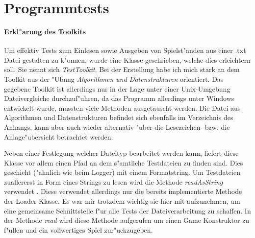 \section{Programmtests}
\FloatBarrier

\paragraph{Erkl"arung des Toolkits}
Um effektiv Tests zum Einlesen sowie Ausgeben von Spielst"anden aus einer .txt Datei gestalten zu k"onnen, wurde eine Klasse geschrieben, welche dies erleichtern soll. Sie nennt sich \emph{TestToolkit}. Bei der Erstellung habe ich mich stark an dem Toolkit aus der "Ubung \emph{Algorithmen und Datenstrukturen} orientiert. Das gegebene Toolkit ist allerdings nur in der Lage unter einer Unix-Umgebung Dateivergleiche durchzuf"uhren, da das Programm allerdings unter Windows entwickelt wurde, mussten viele Methoden ausgetauscht werden. Die Datei aus Algorithmen und Datenstrukturen befindet sich ebenfalls im Verzeichnis des Anhangs, kann aber auch wieder alternativ "uber die Lesezeichen- bzw. die Anlage"ubersicht betrachtet werden. 


Neben einer Festlegung welcher Dateityp bearbeitet werden kann, liefert diese Klasse vor allem einen Pfad an dem s"amtliche Testdateien zu finden sind. Dies geschieht ("ahnlich wie beim Logger) mit einem Formatstring. Um Testdateien zuallererst in Form eines Strings zu lesen wird die Methode \emph{readAsString} verwendet . Diese verwendet allerdings nur die bereits implementierte Methode der Loader-Klasse. Es war mir trotzdem wichtig sie hier mit aufzunehmen, um eine gemeinsame Schnittstelle f"ur alle Tests der Dateiverarbeitung zu schaffen. In der Methode \emph{read} wird diese Methode aufgerufen um einen Game Konstruktor zu f"ullen und ein vollwertiges Spiel zur"uckzugeben. 

